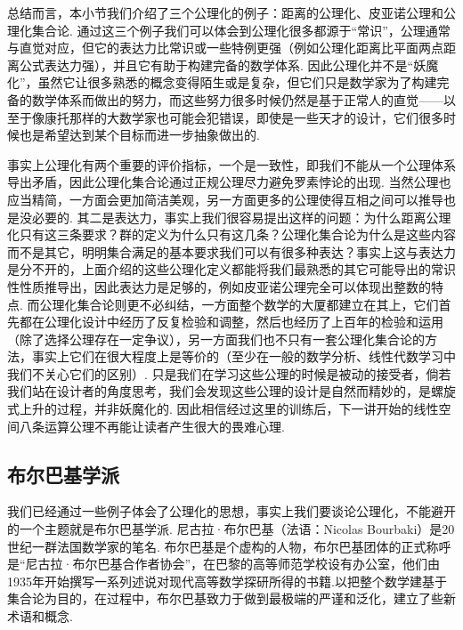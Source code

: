 

总结而言，本小节我们介绍了三个公理化的例子：距离的公理化、皮亚诺公理和公理化集合论. 通过这三个例子我们可以体会到公理化很多都源于``常识''，公理通常与直觉对应，但它的表达力比常识或一些特例更强（例如公理化距离比平面两点距离公式表达力强），并且它有助于构建完备的数学体系. 因此公理化并不是``妖魔化''，虽然它让很多熟悉的概念变得陌生或是复杂，但它们只是数学家为了构建完备的数学体系而做出的努力，而这些努力很多时候仍然是基于正常人的直觉——以至于像康托那样的大数学家也可能会犯错误，即使是一些天才的设计，它们很多时候也是希望达到某个目标而进一步抽象做出的.

事实上公理化有两个重要的评价指标，一个是一致性，即我们不能从一个公理体系导出矛盾，因此公理化集合论通过正规公理尽力避免罗素悖论的出现. 当然公理也应当精简，一方面会更加简洁美观，另一方面更多的公理使得互相之间可以推导也是没必要的. 其二是表达力，事实上我们很容易提出这样的问题：为什么距离公理化只有这三条要求？群的定义为什么只有这几条？公理化集合论为什么是这些内容而不是其它，明明集合满足的基本要求我们可以有很多种表达？事实上这与表达力是分不开的，上面介绍的这些公理化定义都能将我们最熟悉的其它可能导出的常识性性质推导出，因此表达力是足够的，例如皮亚诺公理完全可以体现出整数的特点. 而公理化集合论则更不必纠结，一方面整个数学的大厦都建立在其上，它们首先都在公理化设计中经历了反复检验和调整，然后也经历了上百年的检验和运用（除了选择公理存在一定争议），另一方面我们也不只有一套公理化集合论的方法，事实上它们在很大程度上是等价的（至少在一般的数学分析、线性代数学习中我们不关心它们的区别）. 只是我们在学习这些公理的时候是被动的接受者，倘若我们站在设计者的角度思考，我们会发现这些公理的设计是自然而精妙的，是螺旋式上升的过程，并非妖魔化的. 因此相信经过这里的训练后，下一讲开始的线性空间八条运算公理不再能让读者产生很大的畏难心理.

\subsection*{布尔巴基学派}
我们已经通过一些例子体会了公理化的思想，事实上我们要谈论公理化，不能避开的一个主题就是布尔巴基学派. 尼古拉·布尔巴基（法语：Nicolas Bourbaki）是20世纪一群法国数学家的笔名. 布尔巴基是个虚构的人物，布尔巴基团体的正式称呼是“尼古拉·布尔巴基合作者协会”，在巴黎的高等师范学校设有办公室，他们由1935年开始撰写一系列述说对现代高等数学探研所得的书籍.以把整个数学建基于集合论为目的，在过程中，布尔巴基致力于做到最极端的严谨和泛化，建立了些新术语和概念.

